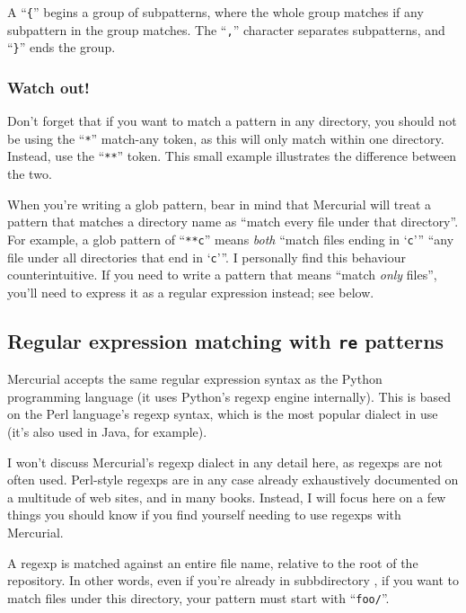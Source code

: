 A ``\texttt{\{}'' begins a group of subpatterns, where the whole group
matches if any subpattern in the group matches.  The ``\texttt{,}''
character separates subpatterns, and ``\texttt{\}}'' ends the group.

\subsubsection{Watch out!}

Don't forget that if you want to match a pattern in any directory, you
should not be using the ``\texttt{*}'' match-any token, as this will
only match within one directory.  Instead, use the ``\texttt{**}''
token.  This small example illustrates the difference between the two.

When you're writing a glob pattern, bear in mind that Mercurial will
treat a pattern that matches a directory name as ``match every file
under that directory''.  For example, a glob pattern of
``\texttt{**c}'' means \emph{both} ``match files ending in
`\texttt{c}''' ``any file under all directories that end in
`\texttt{c}'''.  I personally find this behaviour counterintuitive.
If you need to write a pattern that means ``match \emph{only} files'',
you'll need to express it as a regular expression instead; see below.

\subsection{Regular expression matching with \texttt{re} patterns}

Mercurial accepts the same regular expression syntax as the Python
programming language (it uses Python's regexp engine internally).
This is based on the Perl language's regexp syntax, which is the most
popular dialect in use (it's also used in Java, for example).

I won't discuss Mercurial's regexp dialect in any detail here, as
regexps are not often used.  Perl-style regexps are in any case
already exhaustively documented on a multitude of web sites, and in
many books.  Instead, I will focus here on a few things you should
know if you find yourself needing to use regexps with Mercurial.

A regexp is matched against an entire file name, relative to the root
of the repository.  In other words, even if you're already in
subbdirectory , if you want to match files under this
directory, your pattern must start with ``\texttt{foo/}''.

